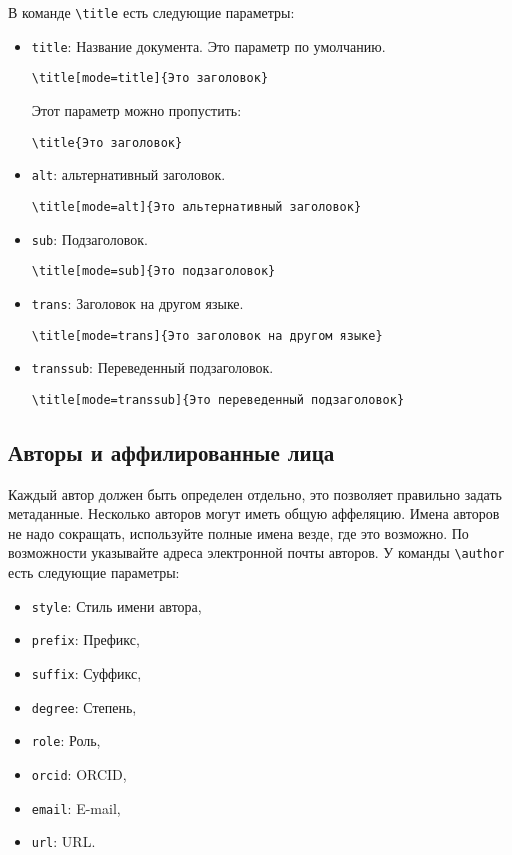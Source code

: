 \documentclass[
12pt,
polyglossia,   %
firacode,    %
wordmath,      %
russian        %
]{isdctart}
\begin{document}
В команде \verb|\title| есть следующие параметры:
\begin{itemize}
\item \verb|title|: Название документа. Это параметр по умолчанию.
\begin{verbatim}
\title[mode=title]{Это заголовок}
\end{verbatim}
Этот параметр можно пропустить:
\begin{verbatim}
\title{Это заголовок}
\end{verbatim}
\item \verb|alt|: альтернативный заголовок.
\begin{verbatim}
\title[mode=alt]{Это альтернативный заголовок}
\end{verbatim}
\item \verb|sub|: Подзаголовок.
\begin{verbatim}
\title[mode=sub]{Это подзаголовок}
\end{verbatim}
\item \verb|trans|: Заголовок на другом языке.
\begin{verbatim}
\title[mode=trans]{Это заголовок на другом языке}
\end{verbatim}
\item \verb|transsub|: Переведенный подзаголовок.
\begin{verbatim}
\title[mode=transsub]{Это переведенный подзаголовок}
\end{verbatim}
\end{itemize}

\subsection{Авторы и аффилированные лица}

Каждый автор должен быть определен отдельно, это позволяет правильно задать метаданные. Несколько авторов могут иметь общую аффеляцию. Имена авторов не надо сокращать, используйте полные имена везде, где это возможно. По возможности указывайте адреса электронной почты авторов.  У команды \verb|\author| есть следующие параметры:

\begin{itemize}
\item \verb|style|: Стиль имени автора,
\item \verb|prefix|: Префикс,
\item \verb|suffix|: Суффикс,
\item \verb|degree|: Степень,
\item \verb|role|: Роль,
\item \verb|orcid|: ORCID,
\item \verb|email|: E-mail,
\item \verb|url|: URL.
\end{itemize}
\end{document}

